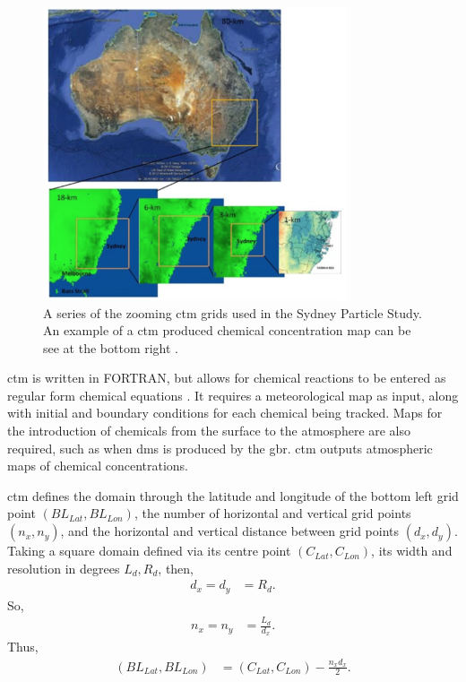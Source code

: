 	\begin{figure}[!htb]
    	\centering
    	\includegraphics[width=0.8\textwidth,natwidth=1308,natheight=952]{Fig/Research/ctmexample.png}
    	\caption{A series of the zooming \gls{ctm} grids used in the Sydney Particle Study. An example of a \gls{ctm} produced chemical concentration map can be see at the bottom right \citep{cope:2014tw}.}
    	\label{fig:sydpartgrid}
	\end{figure}

	\gls{ctm} is written in FORTRAN, but allows for chemical reactions to be entered as regular form chemical equations \citep{cope:2009tz}. It requires a meteorological map as input, along with initial and boundary conditions for each chemical being tracked. Maps for the introduction of chemicals from the surface to the atmosphere are also required, such as when \gls{dms} is produced by the \gls{gbr}. \gls{ctm} outputs atmospheric maps of chemical concentrations.

	\gls{ctm} defines the domain through the latitude and longitude of the bottom left grid point $(BL_{Lat}, BL_{Lon})$, the number of horizontal and vertical grid points $(n_x, n_y)$, and the horizontal and vertical distance between grid points $(d_x, d_y)$.
	Taking a square domain defined via its centre point $(C_{Lat}, C_{Lon})$, its width and resolution in degrees $L_d, R_d$, then,
	\begin{align}
		\label{eq:dxdy}
		d_x = d_y &= R_d.
	\end{align}
	So,
	\begin{align}
		\label{eq:nxny}
		n_x = n_y &= \frac{L_d}{d_x}.
	\end{align}
	Thus,
	\begin{align}
		\label{eq:bottomleft}
		(BL_{Lat}, BL_{Lon}) &= (C_{Lat}, C_{Lon}) - \frac{n_x d_x}{2}.
	\end{align}

